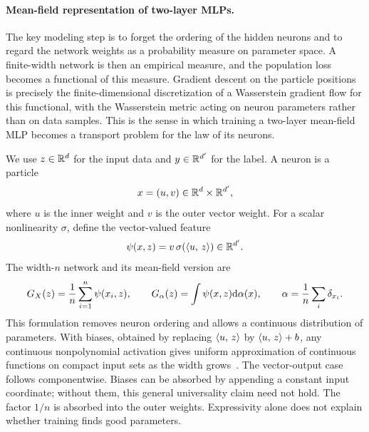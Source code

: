 \paragraph{Mean-field representation of two-layer MLPs.}
The key modeling step is to forget the ordering of the hidden neurons and to regard the network weights as a probability measure on parameter space. A finite-width network is then an empirical measure, and the population loss becomes a functional of this measure. Gradient descent on the particle positions is precisely the finite-dimensional discretization of a Wasserstein gradient flow for this functional, with the Wasserstein metric acting on neuron parameters rather than on data samples. This is the sense in which training a two-layer mean-field MLP becomes a transport problem for the law of its neurons.

We use $z\in\mathbb{R}^d$ for the input data and $y\in\mathbb{R}^{d'}$ for the label. A neuron is a particle
\[
	x=(u,v)\in\mathbb{R}^d\times\mathbb{R}^{d'},
\]
where $u$ is the inner weight and $v$ is the outer vector weight. For a scalar nonlinearity $\sigma$, define the vector-valued feature
\[
	\psi(x,z)=v\,\sigma(\langle u,\,z\rangle)\in\mathbb{R}^{d'}.
\]
The width-$n$ network and its mean-field version are
\[
	G_X(z)=\frac1n\sum_{i=1}^n\psi(x_i,z),
	\qquad
	G_\alpha(z)=\int\psi(x,z)\mathrm{d}\alpha(x),
	\qquad
	\alpha=\frac1n\sum_i\delta_{x_i}.
\]
This formulation removes neuron ordering and allows a continuous distribution of parameters. With biases, obtained by replacing $\langle u,\,z\rangle$ by $\langle u,\,z\rangle+b$, any continuous nonpolynomial activation gives uniform approximation of continuous functions on compact input sets as the width grows~\cite{LeshnoLinPinkusSchocken1993}. The vector-output case follows componentwise. Biases can be absorbed by appending a constant input coordinate; without them, this general universality claim need not hold. The factor $1/n$ is absorbed into the outer weights. Expressivity alone does not explain whether training finds good parameters.


